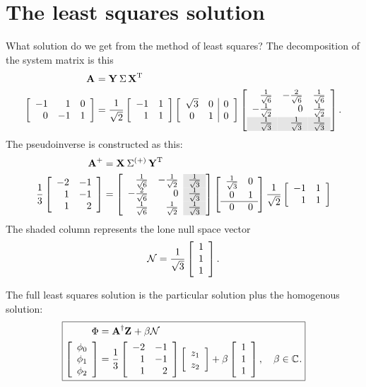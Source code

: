 \section{The least squares solution}

What solution do we get from the method of least squares? The decomposition of the system matrix is this
\begin{equation}
  \begin{split}
    \svda{T}\\
    \mat{rrr}{-1&1&0\\0&-1&1}&=
    \stwo\mat{rr}{-1&1\\1&1}
    \mat{cc|c}{\sqrt{3}&0&0\\0&1&0}
    \mat{rrr}{
    \ssix&-\frac{2}{\sqrt{6}}&\ssix\\
   -\stwo&0&\stwo\\
    \rowcolor{ltgray}
     \sthree&\sthree&\sthree
    }.
  \end{split}
\end{equation}
The pseudoinverse is constructed as this:
\begin{equation}
  \begin{split}
    \mpgia{T}\\
    \frac{1}{3}
    \mat{rr}{-2&-1\\1&-1\\1&2} &=
\left[
\begin{array}{rr>{\columncolor{ltgray}}r}
  \ssix & -\stwo & \sthree \\
 -\frac{2}{\sqrt{6}} & 0 & \sthree \\
  \ssix & \stwo & \sthree
\end{array}
\right]
    \mat{cc}{\sthree &0\\0&1\\\hline0&0}    
    \stwo\mat{rr}{-1&1\\1&1}
  \end{split}
\end{equation}
The shaded column represents the lone null space vector
\begin{equation}
  \mathcal{N} = \sthree \mat{c}{1\\1\\1}.
\end{equation}

The full least squares solution is the particular solution plus the homogenous solution:
\begin{equation}
\boxed{
  \begin{split}
    \Phi&=\A{\dagger}\Z{}+\beta\mathcal{N}\\
    \mat{c}{\phi_{0}\\\phi_{1}\\\phi_{2}}&=\frac{1}{3}
    \mat{rr}{-2&-1\\1&-1\\1&2}
    \mat{c}{z_{1}\\z_{2}}+\beta \mat{c}{1\\1\\1}, \quad \beta\in\cmplx{}.
  \end{split}
}
\end{equation}

